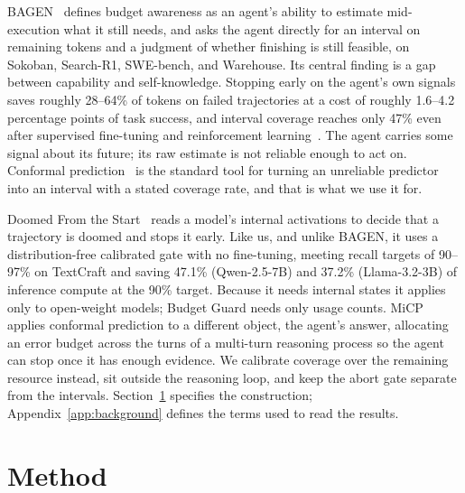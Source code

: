 \documentclass{article}
\begin{document}
BAGEN~\cite{lin2026bagen} defines budget awareness as an agent's ability to estimate mid-execution what it still needs, and asks the agent directly for an interval on remaining tokens and a judgment of whether finishing is still feasible, on Sokoban, Search-R1, SWE-bench, and Warehouse. Its central finding is a gap between capability and self-knowledge. Stopping early on the agent's own signals saves roughly 28--64\% of tokens on failed trajectories at a cost of roughly 1.6--4.2 percentage points of task success, and interval coverage reaches only 47\% even after supervised fine-tuning and reinforcement learning~\cite{lin2026bagen}. The agent carries some signal about its future; its raw estimate is not reliable enough to act on. Conformal prediction~\cite{angelopoulos2023gentle,lei2018distribution} is the standard tool for turning an unreliable predictor into an interval with a stated coverage rate, and that is what we use it for.

Doomed From the Start~\cite{ruan2026doomed} reads a model's internal activations to decide that a trajectory is doomed and stops it early. Like us, and unlike BAGEN, it uses a distribution-free calibrated gate with no fine-tuning, meeting recall targets of 90--97\% on TextCraft and saving 47.1\% (Qwen-2.5-7B) and 37.2\% (Llama-3.2-3B) of inference compute at the 90\% target. Because it needs internal states it applies only to open-weight models; Budget Guard needs only usage counts. MiCP~\cite{zhou2026adaptive} applies conformal prediction to a different object, the agent's answer, allocating an error budget across the turns of a multi-turn reasoning process so the agent can stop once it has enough evidence. We calibrate coverage over the remaining resource instead, sit outside the reasoning loop, and keep the abort gate separate from the intervals. Section~\ref{sec:method} specifies the construction; Appendix~\ref{app:background} defines the terms used to read the results.

\FloatBarrier
\section{Method}
\label{sec:method}
\end{document}
